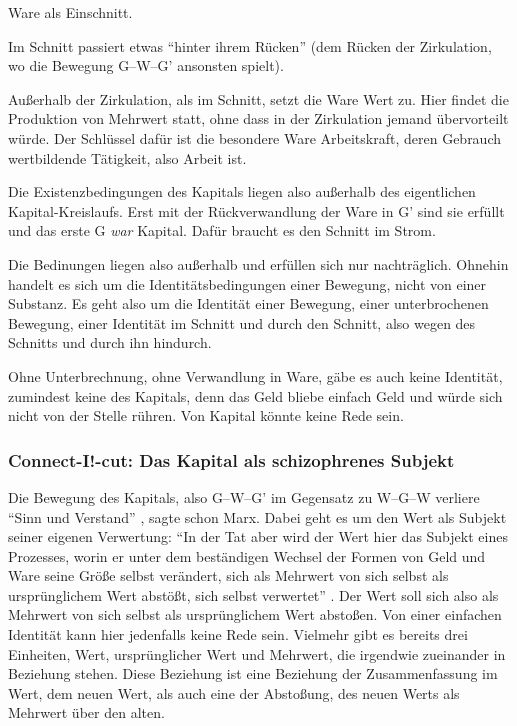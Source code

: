 \documentclass[12pt,
               DIV13,
               paper=a4,
               twoside=false,
               onehalfspacing,
               bibliography=totoc,
               toc=graduated,
               draft,
               ]{scrartcl}
\newcommand{\pc}[2]{\parencite[#1]{#2}}
\newcommand{\gwg}{G--W--G'\xspace}
\newcommand{\wgw}{W--G--W\xspace}
\begin{document}
Ware als Einschnitt.

Im Schnitt passiert etwas "`hinter ihrem Rücken"' \pc{181}{kap} (dem
Rücken der Zirkulation, wo die Bewegung \gwg ansonsten spielt).

Außerhalb der Zirkulation, als im Schnitt, setzt die Ware Wert zu.
Hier findet die Produktion von Mehrwert statt, ohne dass in der
Zirkulation jemand übervorteilt würde. Der Schlüssel dafür ist die
besondere Ware Arbeitskraft, deren Gebrauch wertbildende Tätigkeit,
also Arbeit ist.

Die Existenzbedingungen des Kapitals liegen also außerhalb des
eigentlichen Kapital-Kreislaufs. Erst mit der Rückverwandlung der Ware
in G' sind sie erfüllt und das erste G \emph{war} Kapital. Dafür
braucht es den Schnitt im Strom.

Die Bedinungen liegen also außerhalb und erfüllen sich nur
nachträglich. Ohnehin handelt es sich um die Identitätsbedingungen
einer Bewegung, nicht von einer Substanz. Es geht also um die
Identität einer Bewegung, einer unterbrochenen Bewegung, einer
Identität im Schnitt und durch den Schnitt, also wegen des Schnitts
und durch ihn hindurch.

Ohne Unterbrechnung, ohne Verwandlung in Ware, gäbe es auch keine
Identität, zumindest keine des Kapitals, denn das Geld bliebe einfach
Geld und würde sich nicht von der Stelle rühren. Von Kapital könnte
keine Rede sein.



\subsubsection{Connect-I!-cut: Das Kapital als schizophrenes Subjekt}

Die Bewegung des Kapitals, also \gwg im Gegensatz zu \wgw verliere
"`Sinn und Verstand"' \pc{166}{kap}, sagte schon Marx. Dabei geht es
um den Wert als Subjekt seiner eigenen Verwertung: "`In der Tat aber
wird der Wert hier das Subjekt eines Prozesses, worin er unter dem
beständigen Wechsel der Formen von Geld und Ware seine Größe selbst
verändert, sich als Mehrwert von sich selbst als ursprünglichem Wert
abstößt, sich selbst verwertet"' \pc{169}{kap}. Der Wert soll sich
also als Mehrwert von sich selbst als ursprünglichem Wert abstoßen.
Von einer einfachen Identität kann hier jedenfalls keine Rede sein.
Vielmehr gibt es bereits drei Einheiten, Wert, ursprünglicher Wert und
Mehrwert, die irgendwie zueinander in Beziehung stehen. Diese
Beziehung ist eine Beziehung der Zusammenfassung im Wert, dem neuen
Wert, als auch eine der Abstoßung, des neuen Werts als Mehrwert über
den alten.
\end{document}
